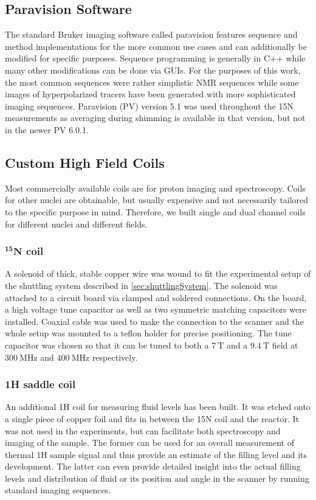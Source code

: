         \subsection{Paravision Software}
            The standard Bruker imaging software called paravision features sequence and method implementations for the more common use cases and can additionally be modified for specific purposes. Sequence programming is generally in C++ while many other modifications can be done via GUIs.  For the purposes of this work, the most common sequences were rather simplistic NMR sequences while some images of hyperpolarized tracers have been generated with more sophisticated imaging sequences. Paravision (PV) version 5.1 was used throughout the 15N measurements as averaging during shimming is available in that version, but not in the newer PV 6.0.1.
        \subsection{Custom High Field Coils}
            Most commercially available coils are for proton imaging and spectroscopy. Coils for other nuclei are obtainable, but usually expensive and not necessarily tailored to the specific purpose in mind. Therefore, we built single and dual channel coils for different nuclei and different fields.
            \subsubsection{$\mathbf{^{15} N}$ coil}
                A solenoid of thick, stable copper wire was wound to fit the experimental setup of the shuttling system described in \ref{sec:shuttlingSystem}. The solenoid was attached to a circuit board via clamped and soldered connections. On the board, a high voltage tune capacitor as well as two symmetric matching capacitors were installed. Coaxial cable was used to make the connection to the scanner and the whole setup was mounted to a teflon holder for precise positioning.  The tune capacitor was chosen so that it can be tuned to both a $\SI{7}{\tesla}$ and a $\SI{9.4}{\tesla}$ field at $\SI{300}{\MHz}$ and $\SI{400}{\MHz}$ respectively.  
            \subsubsection{1H saddle coil} 
            An additional 1H coil for measuring fluid levels has been built. It was etched onto a single piece of copper foil and fits in between the 15N coil and the reactor. It was not used in the experiments, but can facilitate both spectroscopy and imaging of the sample. The former can be used for an overall measurement of thermal 1H sample signal and thus provide an estimate of the filling level and its development. The latter can even provide detailed insight into the actual filling levels and distribution of fluid or its position and angle in the scanner by running standard imaging sequences.
